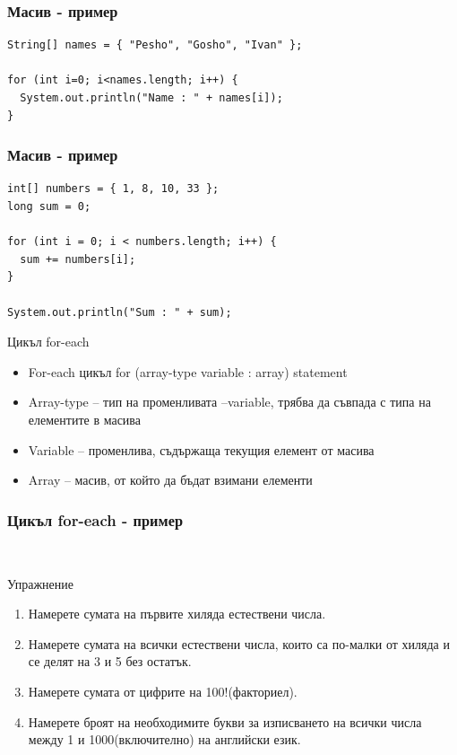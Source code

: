 \documentclass{beamer}
\begin{document}
\begin{frame}[fragile]
  \frametitle{Масив - пример}
  \transdissolve
\begin{lstlisting}
String[] names = { "Pesho", "Gosho", "Ivan" };

for (int i=0; i<names.length; i++) {
  System.out.println("Name : " + names[i]);
}
\end{lstlisting}
\end{frame}

\begin{frame}[fragile]
  \frametitle{Масив - пример}
  \transdissolve
\begin{lstlisting}
int[] numbers = { 1, 8, 10, 33 };
long sum = 0;

for (int i = 0; i < numbers.length; i++) {
  sum += numbers[i];
}

System.out.println("Sum : " + sum);
\end{lstlisting}
\end{frame}

\begin{frame}{Цикъл for-each}
  \transdissolve
  \begin{itemize}
  \item For-each цикъл
    for (array-type variable : array) statement

    \item Array-type – тип на променливата
    –variable, трябва да съвпада с типа на
    елементите в масива
    \item Variable – променлива, съдържаща
    текущия елемент от масива
    \item Array – масив, от който да бъдат
    взимани елементи

  \end{itemize}
\end{frame}

\begin{frame}[fragile]
  \frametitle{Цикъл for-each - пример}
  \transdissolve
\begin{lstlisting}
  
\end{lstlisting}
\end{frame}

\begin{frame}{Упражнение}
  \transdissolve  
  \begin{enumerate}
    \item Намерете сумата на първите хиляда естествени числа.
    \item Намерете сумата на всички естествени числа, които са
      по-малки от хиляда и се делят на 3 и 5 без остатък.
    \item Намерете сумата от цифрите на 100!(факториел).
    \item Намерете броят на необходимите букви за изписването на
      всички числа между 1 и 1000(включително) на английски език.
  \end{enumerate}

\end{frame}
\end{document}
